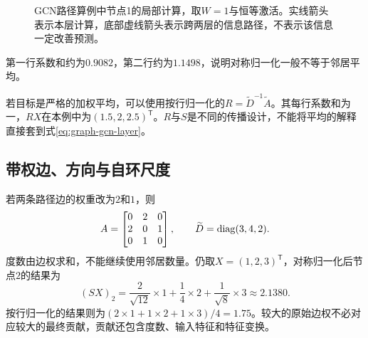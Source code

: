 \begin{figure}[htbp]
\centering
{}
\caption{GCN路径算例中节点1的局部计算，取$W=1$与恒等激活。实线箭头表示本层计算，底部虚线箭头表示跨两层的信息路径，不表示该信息一定改善预测。}
\label{fig:graph-gcn-local-calculation}
\end{figure}

第一行系数和约为$0.9082$，第二行约为$1.1498$，说明对称归一化一般不等于邻居平均。

若目标是严格的加权平均，可以使用按行归一化的$R=\widetilde D^{-1}\widetilde A$。其每行系数和为一，$RX$在本例中为$(1.5,2,2.5)^{\mathsf T}$。$R$与$S$是不同的传播设计，不能将平均的解释直接套到式\eqref{eq:graph-gcn-layer}。

\subsection{带权边、方向与自环尺度}
若两条路径边的权重改为$2$和$1$，则
\begin{equation}
 A=\begin{bmatrix}0&2&0\\2&0&1\\0&1&0\end{bmatrix},\qquad
 \widetilde D=\operatorname{diag}(3,4,2).
\end{equation}
度数由边权求和，不能继续使用邻居数量。仍取$X=(1,2,3)^{\mathsf T}$，对称归一化后节点$2$的结果为
\begin{equation}
 (SX)_2=\frac2{\sqrt{12}}\times1+\frac14\times2+\frac1{\sqrt8}\times3
 \approx2.1380.
\end{equation}
按行归一化的结果则为$(2\times1+1\times2+1\times3)/4=1.75$。较大的原始边权不必对应较大的最终贡献，贡献还包含度数、输入特征和特征变换。

